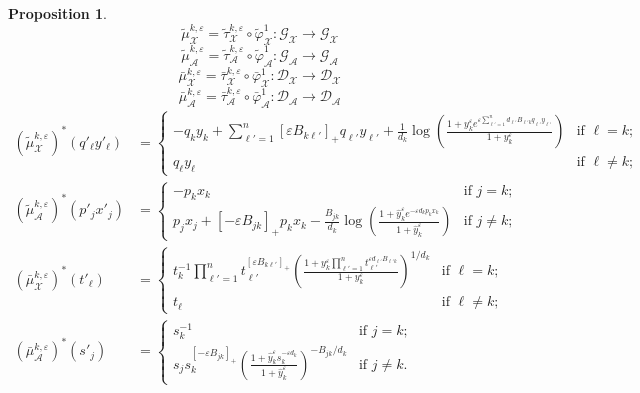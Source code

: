 \documentclass{amsart}
\newtheorem{proposition}[theorem]{Proposition}
\numberwithin{equation}{section}
\newcommand{\cA}{\mathcal{A}}
\newcommand{\cG}{\mathcal{G}}
\renewcommand{\cD}{\mathcal{D}}
\newcommand{\cX}{\mathcal{X}}
\begin{document}
\begin{proposition}
  \label{prop:groupoid mutation}
  \[\tilde\mu_{\cX}^{k,\varepsilon}=\tilde\tau_{\cX}^{k,\varepsilon}\circ\tilde\varphi_{\cX}^1:\cG_\cX\to\cG_\cX\]
  \[\tilde\mu_{\cA}^{k,\varepsilon}=\tilde\tau_{\cA}^{k,\varepsilon}\circ\tilde\varphi_{\cA}^1:\cG_\cA\to\cG_\cA\]
  \[\bar\mu_{\cX}^{k,\varepsilon}=\bar\tau_{\cX}^{k,\varepsilon}\circ\bar\varphi_{\cX}^1:\cD_\cX\to\cD_\cX\]
  \[\bar\mu_{\cA}^{k,\varepsilon}=\bar\tau_{\cA}^{k,\varepsilon}\circ\bar\varphi_{\cA}^1:\cD_\cA\to\cD_\cA\]
  \begin{align}
    \label{eq:GX mutation}
    (\tilde\mu_\cX^{k,\varepsilon})^*(q'_\ell y'_\ell)
    &=\begin{cases} 
      -q_k y_k + \sum\limits_{\ell'=1}^n [\varepsilon B_{k\ell'}]_+ q_{\ell'} y_{\ell'} + \frac{1}{d_k}\log\left(\frac{1+y_k^\varepsilon e^{\varepsilon\sum_{\ell'=1}^n d_{\ell'} B_{\ell' k}q_{\ell'} y_{\ell'}}}{1+y_k^\varepsilon}\right) & \text{if $\ell=k$;}\\ 
      q_\ell y_\ell & \text{if $\ell\ne k$;}
    \end{cases}\\
    \label{eq:GA mutation}
    (\tilde\mu_\cA^{k,\varepsilon})^*(p'_j x'_j)&=
    \begin{cases} 
      -p_k x_k & \text{if $j=k$;}\\ 
      p_j x_j + [-\varepsilon B_{jk}]_+ p_k x_k - \frac{B_{jk}}{d_k}\log\left(\frac{1+\hat y_k^\varepsilon e^{-\varepsilon d_kp_kx_k}}{1+\hat y_k^\varepsilon}\right) & \text{if $j\ne k$;}
    \end{cases}\\
    \label{eq:DX mutation}
    (\bar\mu_\cX^{k,\varepsilon})^*(t'_\ell)
    &=\begin{cases} 
      t_k^{-1}\prod\limits_{\ell'=1}^n t_{\ell'}^{[\varepsilon B_{k\ell'}]_+}\left(\frac{1+y_k^\varepsilon \prod_{\ell'=1}^n t_{\ell'}^{\varepsilon d_{\ell'} B_{\ell' k}}}{1+y_k^\varepsilon}\right)^{1/d_k} & \text{if $\ell=k$;}\\
      t_\ell & \text{if $\ell\ne k$;}
    \end{cases}\\
    \label{eq:DA mutation}
    (\bar\mu_\cA^{k,\varepsilon})^*(s'_j)
    &=\begin{cases} 
      s_k^{-1} & \text{if $j=k$;}\\ 
      s_j s_k^{[-\varepsilon B_{jk}]_+} \left(\frac{1+\hat y_k^\varepsilon s_k^{-\varepsilon d_k}}{1+\hat y_k^\varepsilon}\right)^{-B_{jk}/d_k} & \text{if $j\ne k$.}
    \end{cases}
  \end{align}
\end{proposition}
\end{document}
